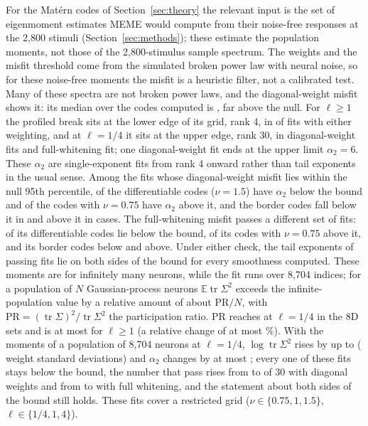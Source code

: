 For the Mat\'ern codes of Section~\ref{sec:theory} the relevant input is the set of eigenmoment estimates MEME would compute from their noise-free responses at the 2,800 stimuli (Section~\ref{sec:methods}); these estimate the population moments, not those of the 2,800-stimulus sample spectrum. The weights and the misfit threshold come from the simulated broken power law with neural noise, so for these noise-free moments the misfit is a heuristic filter, not a calibrated test. Many of these spectra are not broken power laws, and the diagonal-weight misfit shows it: its median over the \MemeMaternN{} codes computed is \MemeMaternMisfitMedian{}, far above the null. For $\ell \ge 1$ the profiled break sits at the lower edge of its grid, rank 4, in \MemeBrkLowDiag{} of \MemeBrkLowTotalDiag{} fits with either weighting, and at $\ell = 1/4$ it sits at the upper edge, rank 30, in \MemeBrkHighDiag{} diagonal-weight fits and \MemeBrkHighFull{} full-whitening fit; one diagonal-weight fit ends at the upper limit $\alpha_2 = 6$. These $\alpha_2$ are single-exponent fits from rank 4 onward rather than tail exponents in the usual sense. Among the \MemeGoodN{} fits whose diagonal-weight misfit lies within the null 95th percentile, \MemeGoodSmoothBelow{} of the \MemeGoodSmoothN{} differentiable codes ($\nu = 1.5$) have $\alpha_2$ below the bound and \MemeGoodRoughAbove{} of the \MemeGoodRoughN{} codes with $\nu = 0.75$ have $\alpha_2$ above it, and the border codes fall below it in \MemeGoodBorderBelow{} and above it in \MemeGoodBorderAbove{} cases. The full-whitening misfit passes a different set of \MemeFullGoodN{} fits: \MemeFullGoodSmoothBelow{} of its \MemeFullGoodSmoothN{} differentiable codes lie below the bound, \MemeFullGoodRoughAbove{} of its \MemeFullGoodRoughN{} codes with $\nu = 0.75$ above it, and its border codes \MemeFullGoodBorderBelow{} below and \MemeFullGoodBorderAbove{} above. Under either check, the tail exponents of passing fits lie on both sides of the bound for every smoothness computed. These moments are for infinitely many neurons, while the fit runs over 8,704 indices; for a population of $N$ Gaussian-process neurons $\mathbb{E}\operatorname{tr}\Sigma^2$ exceeds the infinite-population value by a relative amount of about $\mathrm{PR}/N$, with $\mathrm{PR} = (\operatorname{tr}\Sigma)^2/\operatorname{tr}\Sigma^2$ the participation ratio. PR reaches \MemePRMaxQuarter{} at $\ell = 1/4$ in the 8D sets and is at most \MemePRMaxOne{} for $\ell \ge 1$ (a relative change of at most \MemePRRelMaxOne\%). With the moments of a population of 8,704 neurons at $\ell = 1/4$, $\log\operatorname{tr}\Sigma^2$ rises by up to \MemeNLogTwoMax{} (\MemeNLogTwoSD{} weight standard deviations) and $\alpha_2$ changes by at most \MemeNAlphaShiftMax{}; every one of these fits stays below the bound, the number that pass rises from \MemeNPassInfDiag{} to \MemeNPassFinDiag{} of 30 with diagonal weights and from \MemeNPassInfFull{} to \MemeNPassFinFull{} with full whitening, and the statement about both sides of the bound still holds. These fits cover a restricted grid ($\nu \in \{0.75, 1, 1.5\}$, $\ell \in \{1/4, 1, 4\}$).

